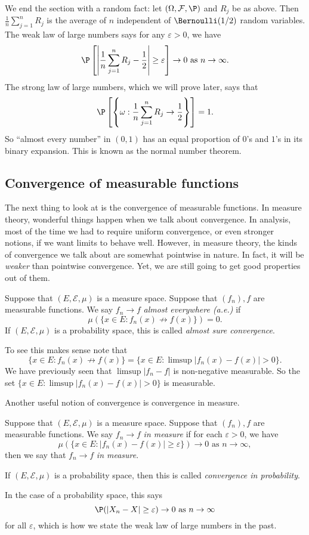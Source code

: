 \documentclass[a4paper]{article}
\begin{document}
We end the section with a random fact: let $(\Omega, \mathcal{F}, \P)$ and $R_j$ be as above. Then $\frac{1}{n} \sum_{j = 1}^n R_j$ is the average of $n$ independent of $\Bernoulli(1/2)$ random variables. The weak law of large numbers says for any $\varepsilon > 0$, we have
\[
  \P\left[\left\lvert\frac{1}{n} \sum_{j = 1}^n R_j - \frac{1}{2}\right\rvert \geq \varepsilon\right] \to 0\text{ as }n\to \infty.
\]
The strong law of large numbers, which we will prove later, says that
\[
  \P\left[\left\{\omega: \frac{1}{n} \sum_{j = 1}^n R_j \to \frac{1}{2}\right\}\right] = 1.
\]
So ``almost every number'' in $(0, 1)$ has an equal proportion of $0$'s and $1$'s in its binary expansion. This is known as the normal number theorem.

\subsection{Convergence of measurable functions}
The next thing to look at is the convergence of measurable functions. In measure theory, wonderful things happen when we talk about convergence. In analysis, most of the time we had to require uniform convergence, or even stronger notions, if we want limits to behave well. However, in measure theory, the kinds of convergence we talk about are somewhat pointwise in nature. In fact, it will be \emph{weaker} than pointwise convergence. Yet, we are still going to get good properties out of them.

\begin{defi}
  Suppose that $(E, \mathcal{E}, \mu)$ is a measure space. Suppose that $(f_n), f$ are measurable functions. We say $f_n \to f$ \emph{almost everywhere (a.e.)} if
  \[
    \mu(\{x \in E: f_n(x) \not\to f(x)\}) = 0.
  \]
  If $(E, \mathcal{E}, \mu)$ is a probability space, this is called \emph{almost sure convergence}.
\end{defi}
To see this makes sense note that
\[
  \{x \in E: f_n(x) \not\to f(x)\} = \{x \in E: \limsup |f_n(x) - f(x)| > 0\}.
\]
We have previously seen that $\limsup |f_n - f|$ is non-negative measurable. So the set $\{x \in E: \limsup |f_n(x) - f(x)| > 0\}$ is measurable.

Another useful notion of convergence is convergence in measure.
\begin{defi}
  Suppose that $(E, \mathcal{E}, \mu)$ is a measure space. Suppose that $(f_n), f$ are measurable functions. We say $f_n \to f$ \emph{in measure} if for each $\varepsilon > 0$, we have
  \[
    \mu(\{x \in E: |f_n(x) - f(x)| \geq \varepsilon\}) \to 0\text{ as } n \to \infty,
  \]
  then we say that $f_n \to f$ \emph{in measure}.

  If $(E, \mathcal{E}, \mu)$ is a probability space, then this is called \emph{convergence in probability}.
\end{defi}
In the case of a probability space, this says
\[
  \P(|X_n - X| \geq \varepsilon) \to 0\text{ as }n \to \infty
\]
for all $\varepsilon$, which is how we state the weak law of large numbers in the past.
\end{document}
